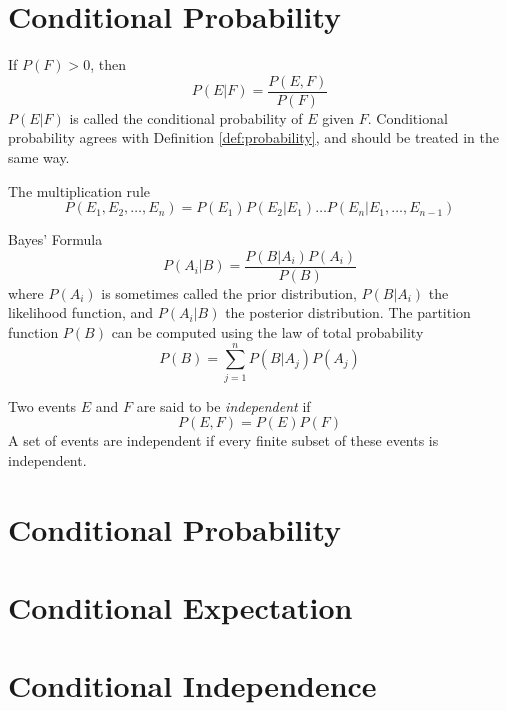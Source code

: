 \section{Conditional Probability}
\begin{deff}
	If $P(F) > 0$, then
	\begin{equation}
		P(E|F) = \frac{P(E,F)}{P(F)}
	\end{equation}
	$P(E|F)$ is called the conditional probability of $E$ given $F$. Conditional probability agrees with Definition \ref{def:probability}, and should be treated in the same way.
\end{deff}

\begin{deff}
	The multiplication rule
	\begin{equation}
		P(E_1, E_2, \ldots, E_n) = P(E_1) P(E_2|E_1) \ldots P(E_n|E_1, \ldots, E_{n-1})
	\end{equation}
\end{deff}

\begin{deff}
	Bayes' Formula
	\begin{equation}
		P(A_i|B) = \frac{P(B|A_i)P(A_i)}{P(B)}
	\end{equation}
	where $P(A_i)$ is sometimes called the prior distribution, $P(B|A_i)$ the likelihood function, and $P(A_i|B)$ the posterior distribution. The partition function $P(B)$ can be computed using the law of total probability
	\begin{equation}
		P(B) = \sum^n_{j=1}P(B|A_j)P(A_j)
	\end{equation}
\end{deff}

\begin{deff}
	Two events $E$ and $F$ are said to be {\em{independent}} if	
	\begin{equation}
		P(E,F) = P(E)P(F)
	\end{equation}
	A set of events are independent if every finite subset of these events is independent.
\end{deff}

\section{Conditional Probability}
\section{Conditional Expectation}
\section{Conditional Independence} 